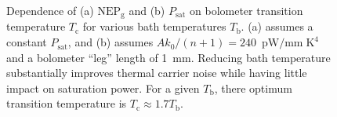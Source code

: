 \begin{figure}
    \centering
    \caption{Dependence of (a) $\mathrm{NEP_{g}}$ and (b) $P_{\mathrm{sat}}$ on bolometer transition temperature $T_{\mathrm{c}}$ for various bath temperatures $T_{\mathrm{b}}$. (a) assumes a constant $P_{\mathrm{sat}}$, and (b) assumes $A k_{0} / (n + 1) = 240$~$\mathrm{pW / mm \; K^{4}}$ and a bolometer ``leg'' length of 1~mm. Reducing bath temperature substantially improves thermal carrier noise while having little impact on saturation power. For a given $T_{\mathrm{b}}$, there optimum transition temperature is $T_{\mathrm{c}} \approx 1.7 T_{\mathrm{b}}$.}
    \label{fig:nepg_vs_Tc}
\end{figure}

